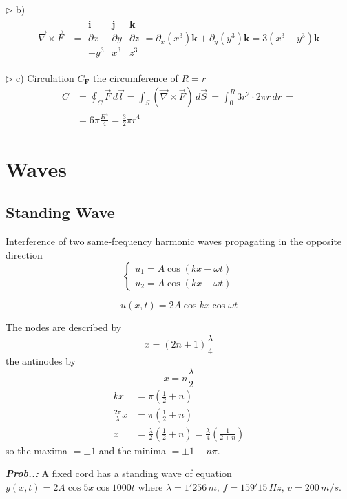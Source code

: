 \documentclass[a4paper]{article}
\begin{document}
$\triangleright$ b)
\begin{align}
\vec{\nabla}\times \vec{F}&=\begin{array}{|ccc|} 
\mathbf{i} & \mathbf{j} & \mathbf{k} \\
\partial x & \partial y & \partial z \\
-y^{3} & x^{3} & z^{3}
\end{array} =\partial_{x}(x^{3})\mathbf{k}+\partial_{y}(y^{3})\mathbf{k}=\boxed{3(x^{3}+y^{3})\mathbf{k}}
\end{align}

$\triangleright$ c) Circulation $C_{\mathbf{F}}$ the circumference of $R=r$
\begin{align}
C&=\oint_{C}\vec{F}\,d\vec{l}=\int _{S}(\vec{\nabla}\times \vec{F}) \, d\vec{S}\,=\int_{0}^{R} 3r^{2}\cdot 2\pi r \, dr\,= \\
&=6\pi \frac{R^{4}}{4}=\boxed{\frac{3}{2}\pi r^{4} } 
\end{align}

\section{Waves}

\setcounter{equation}{0}
\subsection{Standing Wave}
\setcounter{equation}{0}
Interference of two same-frequency harmonic waves propagating in the opposite direction
$$
\begin{cases}
u_{1}=A\cos(kx-\omega t) \\
u_{2}=A\cos(kx-\omega t)
\end{cases}
$$

$$
u(x,t)=2A\cos kx\cos \omega t
$$

The nodes are described by
$$
x=(2n+1)\frac{\lambda}{4}
$$
the antinodes by
$$
x=n \frac{\lambda}{2}
$$
\begin{align*}
kx&=\pi\left( \frac{1}{2}+n \right) \\
\frac{2\pi}{\lambda}x&=\pi\left( \frac{1}{2}+n \right) \\
x&= \frac{\lambda}{2}\left( \frac{1}{2}+n \right)=\frac{\lambda}{4}\left( \frac{1}{2+n} \right)
\end{align*}
so the maxima $=\pm 1$ and the minima $=\pm 1+n\pi$.

\vspace{2ex}\textbf{\textit{Prob.\thesection.\theprob: }}A fixed cord has a standing wave of equation $y(x,t)=2A\cos 5x\cos 1000t$ where $\lambda=1'256\,m,\,f=159'15\,Hz,\,v=200\,m /s$.
\end{document}
